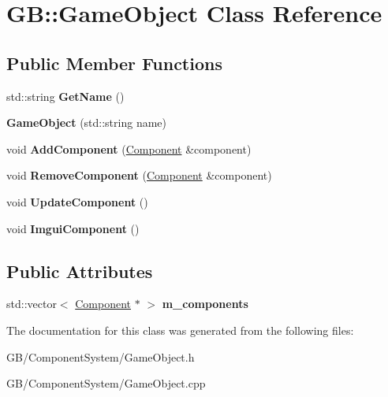 \hypertarget{class_g_b_1_1_game_object}{}\section{GB\+::Game\+Object Class Reference}
\label{class_g_b_1_1_game_object}
\subsection*{Public Member Functions}
\begin{DoxyCompactItemize}
\item 
\mbox{\label{class_g_b_1_1_game_object_aac1979733c3cdfa763e4aebe8ffc910b}} 
std\+::string {\bfseries Get\+Name} ()
\item 
\mbox{\label{class_g_b_1_1_game_object_aceb97055079c147766bbcfcd5284a970}} 
{\bfseries Game\+Object} (std\+::string name)
\item 
\mbox{\label{class_g_b_1_1_game_object_a6a99ef004a2d582bc34f9a5cff0f03f7}} 
void {\bfseries Add\+Component} (\mbox{\hyperlink{class_g_b_1_1_component}{Component}} \&component)
\item 
\mbox{\label{class_g_b_1_1_game_object_abaadc207886a4c2c6466d7def63eaf52}} 
void {\bfseries Remove\+Component} (\mbox{\hyperlink{class_g_b_1_1_component}{Component}} \&component)
\item 
\mbox{\label{class_g_b_1_1_game_object_a1bd21ea17046906c893d65c6b3ab5e05}} 
void {\bfseries Update\+Component} ()
\item 
\mbox{\label{class_g_b_1_1_game_object_aeca4b8d137128c2c3cfc9c6b9890b880}} 
void {\bfseries Imgui\+Component} ()
\end{DoxyCompactItemize}
\subsection*{Public Attributes}
\begin{DoxyCompactItemize}
\item 
\mbox{\label{class_g_b_1_1_game_object_abeff7d2e09a82ec300b38c8bd18f03cf}} 
std\+::vector$<$ \mbox{\hyperlink{class_g_b_1_1_component}{Component}} $\ast$ $>$ {\bfseries m\+\_\+components}
\end{DoxyCompactItemize}


The documentation for this class was generated from the following files\+:\begin{DoxyCompactItemize}
\item 
G\+B/\+Component\+System/Game\+Object.\+h\item 
G\+B/\+Component\+System/Game\+Object.\+cpp\end{DoxyCompactItemize}
